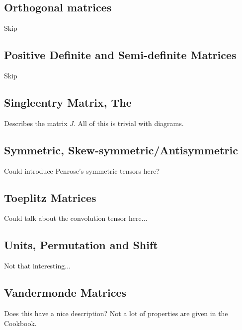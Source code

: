 \subsection{Orthogonal matrices}
Skip
\subsection{Positive Definite and Semi-definite Matrices}
Skip
\subsection{Singleentry Matrix, The}
Describes the matrix $J$.
All of this is trivial with diagrams.
\subsection{Symmetric, Skew-symmetric/Antisymmetric}
Could introduce Penrose's symmetric tensors here?
\subsection{Toeplitz Matrices}
Could talk about the convolution tensor here...
\subsection{Units, Permutation and Shift}
Not that interesting...
\subsection{Vandermonde Matrices}
Does this have a nice description?
Not a lot of properties are given in the Cookbook.


